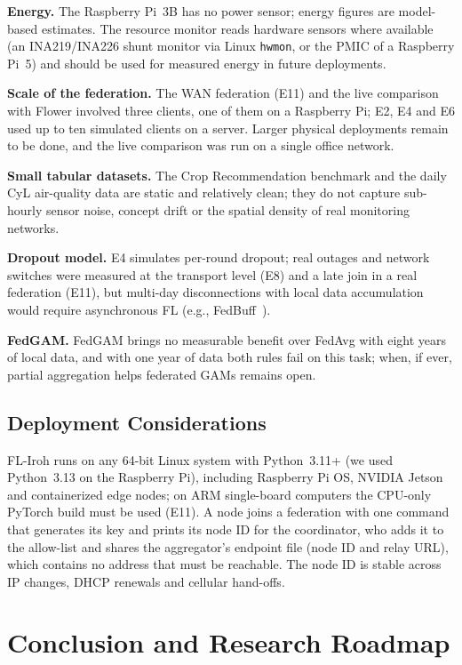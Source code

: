\documentclass[a4paper,fleqn]{cas-dc}
\begin{document}
\textbf{Energy.} The Raspberry Pi~3B has no power sensor; energy figures are model-based estimates. The resource monitor reads hardware sensors where available (an INA219/INA226 shunt monitor via Linux \texttt{hwmon}, or the PMIC of a Raspberry Pi~5) and should be used for measured energy in future deployments.

\textbf{Scale of the federation.} The WAN federation (E11) and the live comparison with Flower involved three clients, one of them on a Raspberry Pi; E2, E4 and E6 used up to ten simulated clients on a server. Larger physical deployments remain to be done, and the live comparison was run on a single office network.

\textbf{Small tabular datasets.} The Crop Recommendation benchmark and the daily CyL air-quality data are static and relatively clean; they do not capture sub-hourly sensor noise, concept drift or the spatial density of real monitoring networks.

\textbf{Dropout model.} E4 simulates per-round dropout; real outages and network switches were measured at the transport level (E8) and a late join in a real federation (E11), but multi-day disconnections with local data accumulation would require asynchronous FL (e.g., FedBuff~\cite{fedbuff2022}).

\textbf{FedGAM.} FedGAM brings no measurable benefit over FedAvg with eight years of local data, and with one year of data both rules fail on this task; when, if ever, partial aggregation helps federated GAMs remains open.

\subsection{Deployment Considerations}

FL-Iroh runs on any 64-bit Linux system with Python~3.11+ (we used Python~3.13 on the Raspberry Pi), including Raspberry Pi OS, NVIDIA Jetson and containerized edge nodes; on ARM single-board computers the CPU-only PyTorch build must be used (E11). A node joins a federation with one command that generates its key and prints its node ID for the coordinator, who adds it to the allow-list and shares the aggregator's endpoint file (node ID and relay URL), which contains no address that must be reachable. The node ID is stable across IP changes, DHCP renewals and cellular hand-offs.

\section{Conclusion and Research Roadmap}
\label{sec:conclusion}
\end{document}
